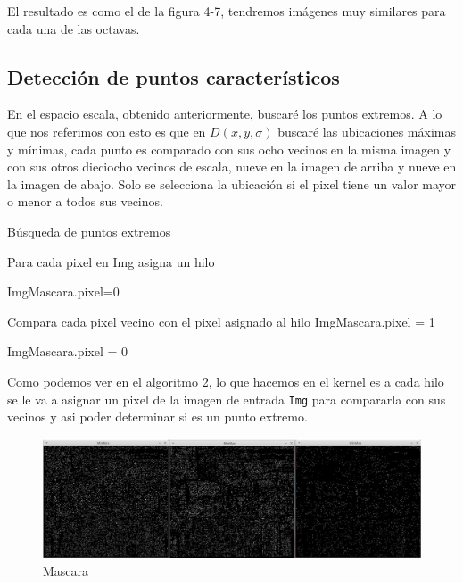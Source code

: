 \pagebreak
El resultado es como el de la figura 4-7, tendremos imágenes muy similares para cada una de las octavas. 



 
\subsection{Detección de puntos característicos}
En el espacio escala, obtenido anteriormente, buscaré los puntos extremos. A lo que nos referimos con esto es que en $D(x,y,\sigma)$ buscaré las ubicaciones máximas y mínimas, cada punto es comparado con sus ocho vecinos en la misma imagen y con sus otros dieciocho vecinos de escala, nueve en la imagen de arriba y nueve en la imagen de abajo. Solo se selecciona la ubicación si el pixel tiene un valor mayor o menor a todos sus vecinos.\\


\begin{algorithm}[H]
\caption{Búsqueda de puntos extremos}
 Para cada pixel en Img asigna un hilo\;
 
 {
	{
		ImgMascara.pixel=0\;
	}{
		{
			Compara cada pixel vecino con el pixel asignado al hilo\;
			{
				ImgMascara.pixel = 1\;			
			}{
				ImgMascara.pixel = 0\;
			
			}
		
		}
		
	}
 }
	
\end{algorithm}


Como podemos ver en el algoritmo 2, lo que hacemos en el kernel es a cada hilo se le va a asignar un pixel de la imagen de entrada \texttt{Img} para compararla con sus vecinos y asi poder determinar si es un punto extremo.\\ \pagebreak
 
\begin{figure}[h]
			\centering
				\includegraphics[scale=0.3]{img/minmaxs.jpg}
			\caption{Mascara}
\end{figure} 
 
